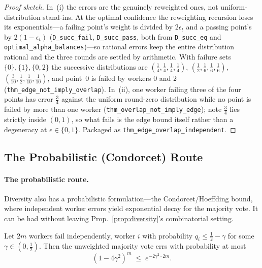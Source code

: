 \begin{proof}[Proof sketch]
In~(i) the errors are the genuinely reweighted ones, not uniform-distribution stand-ins. At the optimal confidence the reweighting recursion loses its exponentials---a failing point's weight is divided by $2\epsilon_t$ and a passing point's by $2(1-\epsilon_t)$ (\texttt{D\_succ\_fail}, \texttt{D\_succ\_pass}, both from \texttt{D\_succ\_eq} and \texttt{optimal\_alpha\_balances})---so rational errors keep the entire distribution rational and the three rounds are settled by arithmetic. With failure sets $\{0\},\{1\},\{0,2\}$ the successive distributions are $(\tfrac14,\tfrac14,\tfrac14,\tfrac14)$, $(\tfrac12,\tfrac16,\tfrac16,\tfrac16)$, $(\tfrac3{10},\tfrac12,\tfrac1{10},\tfrac1{10})$, and point~$0$ is failed by workers $0$ and $2$ (\texttt{thm\_edge\_not\_imply\_overlap}). In~(ii), one worker failing three of the four points has error $\tfrac34$ against the uniform round-zero distribution while no point is failed by more than one worker (\texttt{thm\_overlap\_not\_imply\_edge}); note $\tfrac34$ lies strictly inside $(0,1)$, so what fails is the edge bound itself rather than a degeneracy at $\epsilon\in\{0,1\}$. Packaged as \texttt{thm\_edge\_overlap\_independent}.
\end{proof}


\subsection{The Probabilistic (Condorcet) Route}

\paragraph{The probabilistic route.} Diversity also has a probabilistic formulation---the Condorcet/Hoeffding bound, where independent worker errors yield exponential decay for the majority vote. It can be had without leaving Prop.~\ref{prop:diversity}'s combinatorial setting.

\begin{proposition}
\label{prop:condorcet}
Let $2m$ workers fail independently, worker $i$ with probability $q_i\le\tfrac12-\gamma$ for some $\gamma\in(0,\tfrac12)$. Then the unweighted majority vote errs with probability at most
\[
(1-4\gamma^2)^m \;\le\; e^{-2\gamma^2\cdot 2m}.
\]
\end{proposition}

